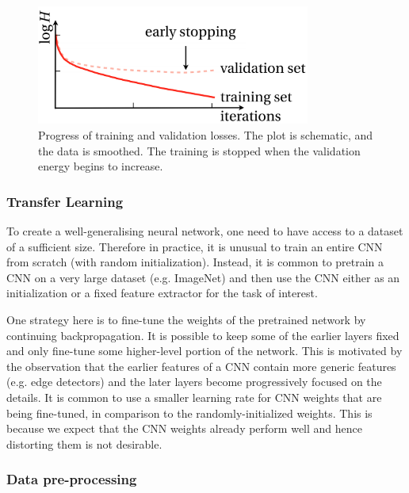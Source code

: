 \vspace{4mm}
\begin{figure}[htb]
	\begin{center}
		\includegraphics*[width=9cm, keepaspectratio]{obr/early.png}
	\end{center}
	\vspace{4mm}
	\caption{Progress of training and validation losses. The plot is schematic, and
	the data is smoothed. The training is stopped when the validation energy begins to
	increase. \cite{mehlig}} 
	\label{}
\end{figure}

\subsubsection{Transfer Learning}

To create a well-generalising neural network, one need to have access to a dataset of a sufficient size. Therefore in practice, it is unusual to train an entire CNN from scratch (with random initialization). Instead, it is common to pretrain a CNN on a very large dataset (e.g. ImageNet) and then use the CNN either as an initialization or a fixed feature extractor for the task of interest. \cite{stanford-L7}

One strategy here is to fine-tune the weights of the pretrained network by continuing backpropagation. It is possible to keep some of the earlier layers fixed and only fine-tune some higher-level portion of the network. This is motivated by the observation that the earlier features of a CNN contain more generic features (e.g. edge detectors) and the later layers become progressively focused on the details. It is common to use a smaller learning rate for CNN weights that are being fine-tuned, in comparison to the randomly-initialized weights. This is because we expect that the CNN weights already perform well and hence distorting them is not desirable. \cite{stanford-L7} \cite{stanford-github}

\subsubsection{Data pre-processing}

